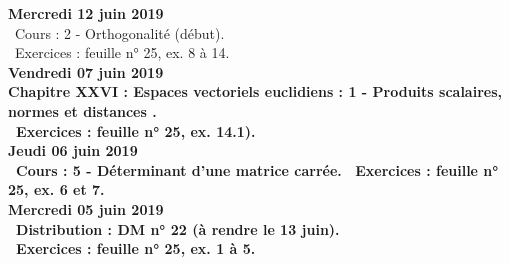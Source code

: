 \documentclass[12pt,a4paper]{article}
\begin{document}
% 
% 
% 
% 

\noindent\textbf{Mercredi 12 juin 2019}\\
\bu\ Cours :  2 - Orthogonalité (début).\\
\bu\ Exercices : feuille n° 25, ex. 8 à 14.\vspace{.4cm}\\

\noindent\textbf{Vendredi 07 juin 2019}\\
\bf Chapitre XXVI \rm : Espaces vectoriels euclidiens : 1 - Produits scalaires, normes et distances .\\
\bu\ Exercices : feuille n° 25, ex. 14.1).\vspace{.4cm}\\
 
\noindent\textbf{Jeudi 06 juin 2019}\\
\bu\ Cours : 5 - Déterminant d'une matrice carrée.
\bu\ Exercices : feuille n° 25, ex. 6 et 7.\vspace{.4cm}\\

\noindent\textbf{Mercredi 05 juin 2019}\\
\bu\ Distribution : DM n° 22 (à rendre le 13 juin).\\
\bu\ Exercices : feuille n° 25, ex. 1 à 5.\vspace{.4cm}\\
 
\end{document}

